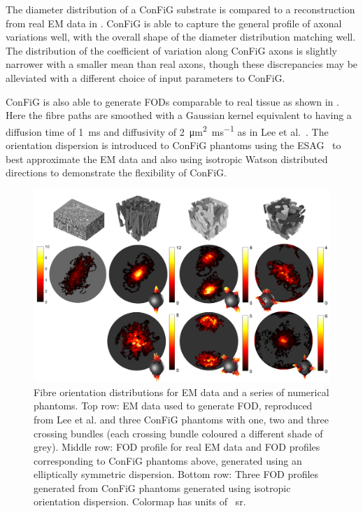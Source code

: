 The diameter distribution of a \ac{ConFiG} substrate is compared to a reconstruction from real \ac{EM} data \cite{Lee2019b} in . \ac{ConFiG} is able to capture the general profile of axonal variations well, with the overall shape of the diameter distribution matching well. The distribution of the coefficient of variation along \ac{ConFiG} axons is slightly narrower with a smaller mean than real axons, though these discrepancies may be alleviated with a different choice of input parameters to \ac{ConFiG}.

\ac{ConFiG} is also able to generate \acp{FOD} comparable to real tissue as shown in . Here the fibre paths are smoothed with a Gaussian kernel equivalent to having a diffusion time of \SI{1}{\milli\second} and diffusivity of \SI{2}{\micro\metre\squared\per\milli\second} as in Lee et al.\ \cite{Lee2019b}. The orientation dispersion is introduced to \ac{ConFiG} phantoms using the \acf{ESAG}~\cite{Paine2018} to best approximate the \ac{EM} data and also using isotropic Watson distributed directions to demonstrate the flexibility of \ac{ConFiG}.


\begin{figure}
  \centering
  \includegraphics[width=\textwidth]{figures/config/OD_ESAG_wcolorbar_wiso_sym_whitebg.png}
  \caption[Orientation distributions from real WM and \ac{ConFiG} phantoms]{Fibre orientation distributions for \ac{EM} data and a series of numerical phantoms. Top row: \ac{EM} data used to generate \ac{FOD}, reproduced from Lee et al. \cite{Lee2019b} and three \ac{ConFiG} phantoms with one, two and three crossing bundles (each crossing bundle coloured a different shade of grey). Middle row: \ac{FOD} profile for real \ac{EM} data and \ac{FOD} profiles corresponding to \ac{ConFiG} phantoms above, generated using an elliptically symmetric dispersion. Bottom row: Three \ac{FOD} profiles generated from \ac{ConFiG} phantoms generated using isotropic orientation dispersion. Colormap has units of \si{\per\steradian}. }
  \label{fig:config_res_OD}
\end{figure}


